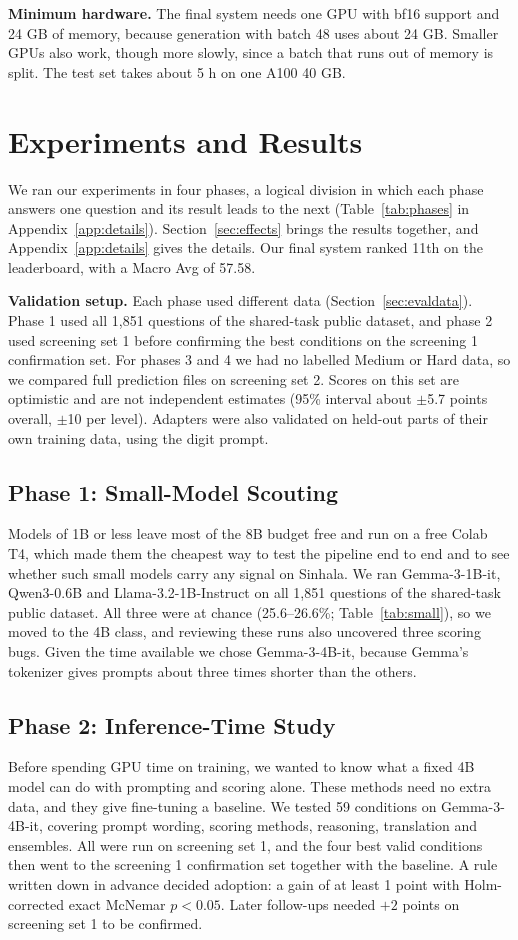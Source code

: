 \documentclass[11pt]{article}
\newcommand{\para}[1]{\smallskip\noindent\textbf{#1}\enspace}
\begin{document}
\para{Minimum hardware.} The final system needs one GPU with bf16 support and 24 GB of memory, because generation with batch 48 uses about 24 GB. Smaller GPUs also work, though more slowly, since a batch that runs out of memory is split. The test set takes about 5 h on one A100 40 GB.

\section{Experiments and Results}\label{sec:results}
We ran our experiments in four phases, a logical division in which each phase answers one question and its result leads to the next (Table~\ref{tab:phases} in Appendix~\ref{app:details}). Section~\ref{sec:effects} brings the results together, and Appendix~\ref{app:details} gives the details. Our final system ranked 11th on the leaderboard, with a Macro Avg of 57.58.

\para{Validation setup.} Each phase used different data (Section~\ref{sec:evaldata}). Phase 1 used all 1,851 questions of the shared-task public dataset, and phase 2 used screening set 1 before confirming the best conditions on the screening 1 confirmation set. For phases 3 and 4 we had no labelled Medium or Hard data, so we compared full prediction files on screening set 2. Scores on this set are optimistic and are not independent estimates (95\% interval about $\pm$5.7 points overall, $\pm$10 per level). Adapters were also validated on held-out parts of their own training data, using the digit prompt.

\subsection{Phase 1: Small-Model Scouting}
Models of 1B or less leave most of the 8B budget free and run on a free Colab T4, which made them the cheapest way to test the pipeline end to end and to see whether such small models carry any signal on Sinhala. We ran Gemma-3-1B-it, Qwen3-0.6B and Llama-3.2-1B-Instruct on all 1,851 questions of the shared-task public dataset. All three were at chance (25.6--26.6\%; Table~\ref{tab:small}), so we moved to the 4B class, and reviewing these runs also uncovered three scoring bugs. Given the time available we chose Gemma-3-4B-it, because Gemma's tokenizer gives prompts about three times shorter than the others.

\subsection{Phase 2: Inference-Time Study}\label{sec:phase2}\label{sec:prefill}
Before spending GPU time on training, we wanted to know what a fixed 4B model can do with prompting and scoring alone. These methods need no extra data, and they give fine-tuning a baseline. We tested 59 conditions on Gemma-3-4B-it, covering prompt wording, scoring methods, reasoning, translation and ensembles. All were run on screening set 1, and the four best valid conditions then went to the screening 1 confirmation set together with the baseline. A rule written down in advance decided adoption: a gain of at least 1 point with Holm-corrected exact McNemar $p<0.05$. Later follow-ups needed $+2$ points on screening set 1 to be confirmed.
\end{document}
